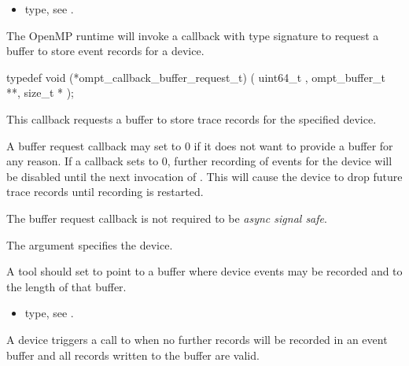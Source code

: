 \crossreferences
\begin{itemize}
\item {} type, see
.
\end{itemize}


\label{sec:ompt_callback_buffer_request_t}

\summary
The OpenMP runtime will invoke a callback with type signature  
 to request a
buffer to store event records for a device.

\format

\begin{ccppspecific}
\begin{omptCallback}
typedef void (*ompt_callback_buffer_request_t) (
  uint64_t ,
  ompt_buffer_t **,
  size_t *
);
\end{omptCallback}
\end{ccppspecific}


\descr
This callback requests a buffer to store trace records for the
specified device.

A buffer request callback may set  to 0 if it does not
want to provide a buffer for any reason. If a callback sets
 to 0, further recording of events for the device will be
disabled until the next invocation of .  This
will cause the device to drop future trace records until recording is
restarted.

The buffer request callback is not required to be \emph{async signal safe}.

\argdesc

The argument  specifies the device. 

A tool should set  to point to a buffer where device events
may be recorded and  to the length of that buffer.  

\crossreferences
\begin{itemize}
\item {} type, see
.
\end{itemize}

\label{sec:ompt_callback_buffer_complete_t}
\summary
A device triggers a call to  when no further records will be recorded in an event buffer and all records written to the buffer are valid. 

